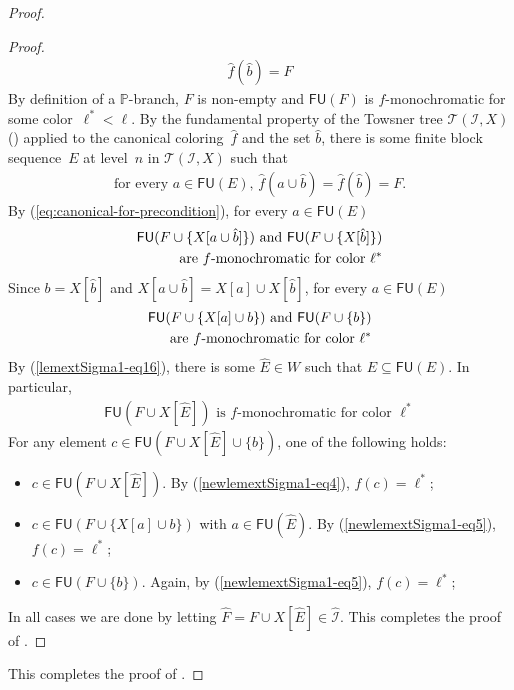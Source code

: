 \documentclass[10pt,a4paper]{article}
\def\PP{\mathbb{P}}
\def\Tc{\mathcal{T}}
\def\I{\mathcal{I}}
\newcommand{\FU}[0]{\mathsf{FU}} %
\def\h#1{\hat{#1}}
\numberwithin{theorem}{section}
\begin{document}
\begin{proof}
\begin{proof}
\begin{align}\label{newlemextSigma1-good-color}
\h f(\h b) = F
\end{align}
By definition of a $\PP$-branch, $F$ is non-empty and $\FU(F)$ is $f$-monochromatic for some color~$\ell^* < \ell$.
By the fundamental property of the Towsner tree $\Tc(\I, X)$ () applied to the canonical coloring~$\h f$ and the set $\hat b$, there is some finite block sequence~$E$ at level~$n$ in $\Tc(\I, X)$ such that
\begin{align}\label{newlemextSigma1-eq2}
\text{for every $a \in \FU(E)$, $\h f(a \cup \h b) = \h f(\h b) = F$.} 
\end{align}
By (\ref{eq:canonical-for-precondition}), for every $a \in \FU(E)$
\begin{align}\label{newlemextSigma1-eq3}
\text{$\FU(F \cup \{X[a \cup \h b]\})$ and $\FU(F \cup \{X[\h b]\})$} \notag\\
\text{are $f$-monochromatic for color~$\ell^*$}
\end{align}
Since $b = X[\h b]$ and $X[a \cup \h b] = X[a] \cup X[\h b]$, for every $a \in \FU(E)$
\begin{align}\label{newlemextSigma1-eq5}
\text{$\FU(F \cup \{X[a] \cup b\})$ and $\FU(F \cup \{b\})$} \notag\\
\text{are $f$-monochromatic for color~$\ell^*$}
\end{align}
By (\ref{lemextSigma1-eq16}), there is some $\h E \in W$ such that $\h E \subseteq \FU(E)$. In particular, 
\begin{align}\label{newlemextSigma1-eq4}
\text{$\FU(F \cup X[\h E])$ is $f$-monochromatic for color~$\ell^*$}
\end{align}
For any element $c \in \FU(F \cup X[\h E] \cup \{b\})$, one of the following holds:
\begin{itemize}
    \item[(i)] $c \in \FU(F \cup X[\h E])$. By (\ref{newlemextSigma1-eq4}), $f(c) = \ell^*$;
    \item[(ii)] $c \in \FU(F \cup \{X[a] \cup b\})$ with $a \in \FU(\h E)$. By (\ref{newlemextSigma1-eq5}), $f(c) = \ell^*$;
    \item[(iii)] $c \in \FU(F \cup \{b\})$. Again, by (\ref{newlemextSigma1-eq5}), $f(c) = \ell^*$;
\end{itemize}
In all cases we are done by letting $\hat F = F \cup X[\h E] \in \h \I$.
This completes the proof of .
\end{proof}
This completes the proof of .
\end{proof}
\end{document}
